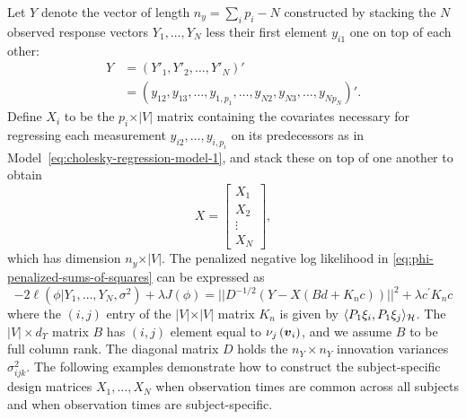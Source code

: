 Let $Y$ denote the vector of length $n_y= \sum_{i} p_i - N$  constructed by stacking the $N$ observed response vectors $Y_1,\dots, Y_N$ less their first element $y_{i1}$ one on top of each other:
\begin{align}\label{eq:stacked-response-vector}
Y &= \left( Y'_1, Y'_2, \dots, Y'_{N} \right)'\\
 &= \left( y_{12}, y_{13},\dots, y_{1,p_1}, \dots, y_{N2}, y_{N3},\dots, y_{Np_N} \right)'.
\end{align}
\noindent
Define $X_i$ to be the $p_i \times \vert V \vert$ matrix containing the covariates necessary for regressing each measurement $y_{i2}, \dots, y_{i,p_i}$ on its predecessors as in Model~\eqref{eq:cholesky-regression-model-1}, and stack these on top of one another to obtain
\begin{equation} \label{eq:ar-design-matrix-1}
X = \begin{bmatrix}
X_1 \\
X_2\\
\vdots \\
X_N
\end{bmatrix},
\end{equation}
\noindent
which has dimension $n_y \times \vert V \vert$. The penalized negative log likelihood in \eqref{eq:phi-penalized-sums-of-squares} can be expressed as
\begin{equation} \label{eq:penalized-likelihood-vectorized}
-2\ell\left(\phi \vert Y_1,\dots, Y_N, \sigma^2\right) + \lambda J\left(\phi\right) = \vert \vert D^{-1/2}\left( Y - X \left( Bd + K_nc \right) \right) \vert \vert^2  + \lambda c^\prime K_n c 
\end{equation}
\noindent
where the $\left(i,j\right)$ entry of the $\vert V \vert \times \vert V \vert$ matrix $K_n$ is given by $\langle P_1 \xi_i,  P_1 \xi_j \rangle_{\mathcal{H}}$. The $\vert V \vert \times d_\Upsilon$ matrix $B$ has $\left(i,j\right)$ element equal to $\nu_j\left(\mbox{\boldmath $v$}_i\right)$, and we assume $B$ to be full column rank.  The diagonal matrix $D$ holds the $n_Y \times n_Y$  innovation variances $\sigma^2_{ijk}$. The following examples demonstrate how to construct the subject-specific design matrices $X_1,\dots, X_N$ when observation times are common across all subjects and when observation times are subject-specific.

